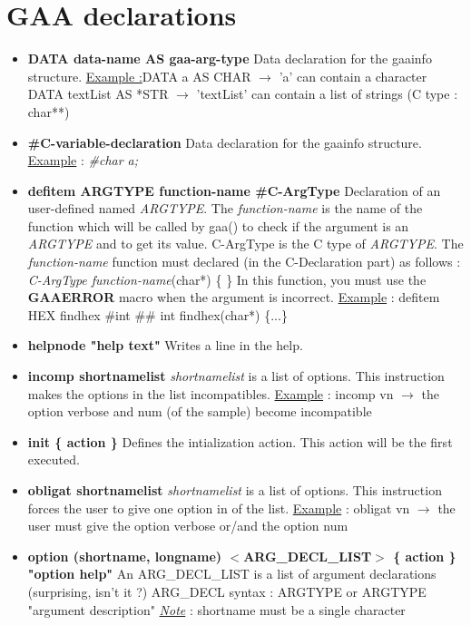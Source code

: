 \section{GAA declarations}
 \begin{itemize}
  \item {\bf DATA data-name AS gaa-arg-type}
   Data declaration for the gaainfo structure.
   \underline{Example :}DATA a AS CHAR $\rightarrow$ 'a' can contain a character
   DATA textList AS *STR $\rightarrow$ 'textList' can contain a list of strings
   (C type : char**)
  \item {\bf \#C-variable-declaration} Data declaration for the gaainfo structure.
   \underline{Example} :
   {\it \#char a;}
  \item {\bf defitem ARGTYPE function-name \#C-ArgType}  Declaration of an user-defined named {\it ARGTYPE}.
    The {\it function-name} is the name of the function which will be called
    by gaa() to check if the argument is an {\it ARGTYPE} and to get its value.
    C-ArgType is the C type of {\it ARGTYPE}. The {\it function-name} function
   must declared (in the C-Declaration part) as follows :
    {\it C-ArgType function-name}(char*) \{ \}
    In this function, you must use the {\bf GAAERROR}
    macro when the argument is incorrect.
    \underline{Example} :
    defitem HEX findhex \#int
    \#\#
    int findhex(char*) \{...\}
  \item {\bf helpnode "help text"} Writes a line in the help.
  \item {\bf incomp shortnamelist} {\it  shortnamelist} is a list of options. This
    instruction makes the options in the list incompatibles.
    \underline{Example} :
    incomp vn $\rightarrow$ the option verbose and num (of the sample)
    become incompatible
  \item {\bf init \{ action \}}  Defines the intialization action. This action will
    be the first executed.
  \item {\bf obligat shortnamelist} {\it  shortnamelist} is a list of options. This
    instruction forces the user to give one option in of the list.
    \underline{Example} :
    obligat vn $\rightarrow$ the user must give the option verbose
    or/and the option num
  \item {\bf option (shortname, longname) $<$ARG\_DECL\_LIST$>$ \{
    action \} "option help"}
    An ARG\_DECL\_LIST is a list of argument declarations
    (surprising, isn't it ?)
     ARG\_DECL syntax : ARGTYPE
      or ARGTYPE "argument description"
     {\it \underline{Note}} : shortname must be a single character

\end{itemize}
